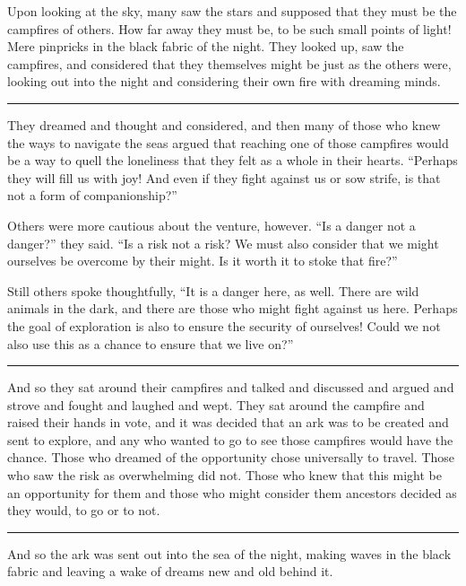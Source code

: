 Upon looking at the sky, many saw the stars and supposed that they must be the campfires of others. How far away they must be, to be such small points of light! Mere pinpricks in the black fabric of the night. They looked up, saw the campfires, and considered that they themselves might be just as the others were, looking out into the night and considering their own fire with dreaming minds.

\begin{center}\rule{0.5\linewidth}{0.5pt}\end{center}

They dreamed and thought and considered, and then many of those who knew the ways to navigate the seas argued that reaching one of those campfires would be a way to quell the loneliness that they felt as a whole in their hearts. ``Perhaps they will fill us with joy! And even if they fight against us or sow strife, is that not a form of companionship?''

Others were more cautious about the venture, however. ``Is a danger not a danger?'' they said. ``Is a risk not a risk? We must also consider that we might ourselves be overcome by their might. Is it worth it to stoke that fire?''

Still others spoke thoughtfully, ``It is a danger here, as well. There are wild animals in the dark, and there are those who might fight against us here. Perhaps the goal of exploration is also to ensure the security of ourselves! Could we not also use this as a chance to ensure that we live on?''

\begin{center}\rule{0.5\linewidth}{0.5pt}\end{center}

And so they sat around their campfires and talked and discussed and argued and strove and fought and laughed and wept. They sat around the campfire and raised their hands in vote, and it was decided that an ark was to be created and sent to explore, and any who wanted to go to see those campfires would have the chance. Those who dreamed of the opportunity chose universally to travel. Those who saw the risk as overwhelming did not. Those who knew that this might be an opportunity for them and those who might consider them ancestors decided as they would, to go or to not.

\begin{center}\rule{0.5\linewidth}{0.5pt}\end{center}

And so the ark was sent out into the sea of the night, making waves in the black fabric and leaving a wake of dreams new and old behind it.

